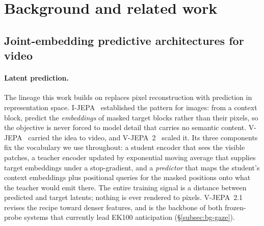 \section{Background and related work}

\subsection{Joint-embedding predictive architectures for video}
\label{subsec:bg-jepa}
\paragraph{Latent prediction.}
The lineage this work builds on replaces pixel reconstruction with prediction in
representation space. I-JEPA~\citep{assran2023ijepa} established the pattern for
images: from a context block, predict the \emph{embeddings} of masked target
blocks rather than their pixels, so the objective is never forced to model detail
that carries no semantic content. V-JEPA~\citep{bardes2024vjepa} carried the idea
to video, and V-JEPA~2~\citep{assran2025vjepa2} scaled it. Its three components
fix the vocabulary we use throughout: a student encoder that sees the visible
patches, a teacher encoder updated by exponential moving average that supplies
target embeddings under a stop-gradient, and a \emph{predictor} that maps the
student's context embeddings plus positional queries for the masked positions
onto what the teacher would emit there. The entire training signal is a distance
between predicted and target latents; nothing is ever rendered to pixels.
V-JEPA~2.1~\citep{murlabadia2026vjepa21} revises the recipe toward denser
features, and is the backbone of both frozen-probe systems that currently lead
EK100 anticipation (\S\ref{subsec:bg-gaze}).

